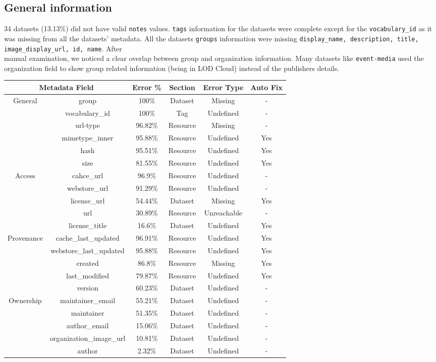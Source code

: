 \documentclass[runningheads,a4paper]{llncs}
\begin{document}
\subsection{General information} 34 datasets (13.13\%) did not have valid \texttt{notes} values. \texttt{tags} information for the datasets were complete except for the \texttt{vocabulary\_id} as it was missing from all the datasets' metadata. All the datasets \texttt{groups} information were missing \texttt{display\_name, description, title, image\_display\_url, id, name}. After \\manual examination, we noticed a clear overlap between group and organization information. Many datasets like \texttt{event-media} used the organization field to show group related information (being in LOD Cloud) instead of the publishers details.\\

\begin{center}
\begin{tabular}{|c|c|c|c|c|c|}

\hline
\multicolumn{2}{|c|}{Metadata Field} & Error \% & Section & Error Type & Auto Fix\tabularnewline
\hline
\hline
\multirow{6}{*}{General } & group & 100\% & Dataset & Missing & -\tabularnewline
\cline{2-6}
 & vocabulary\_id & 100\% & Tag & Undefined & -\tabularnewline
\cline{2-6}
 & url-type & 96.82\% & Resource & Missing & -\tabularnewline
\cline{2-6}
 & mimetype\_inner & 95.88\% & Resource & Undefined & Yes\tabularnewline
\cline{2-6}
 & hash & 95.51\% & Resource & Undefined & Yes\tabularnewline
\cline{2-6}
 & size & 81.55\% & Resource & Undefined & Yes\tabularnewline
\hline
\multirow{5}{*}{Access } & cahce\_url & 96.9\% & Resource & Undefined & -\tabularnewline
\cline{2-6}
 & webstore\_url & 91.29\% & Resource & Undefined & -\tabularnewline
\cline{2-6}
 & license\_url & 54.44\% & Dataset & Missing & Yes\tabularnewline
\cline{2-6}
 & url & 30.89\% & Resource & Unreachable & -\tabularnewline
\cline{2-6}
 & license\_title & 16.6\% & Dataset & Undefined & Yes\tabularnewline
\hline
\multirow{5}{*}{Provenance } & cache\_last\_updated & 96.91\% & Resource & Undefined & Yes\tabularnewline
\cline{2-6}
 & webstore\_last\_updated & 95.88\% & Resource & Undefined & Yes\tabularnewline
\cline{2-6}
 & created & 86.8\% & Resource & Missing & Yes\tabularnewline
\cline{2-6}
 & last\_modified & 79.87\% & Resource & Undefined & Yes\tabularnewline
\cline{2-6}
 & version & 60.23\% & Dataset & Undefined & -\tabularnewline
\hline
\multirow{5}{*}{Ownership } & maintainer\_email & 55.21\% & Dataset & Undefined & -\tabularnewline
\cline{2-6}
 & maintainer & 51.35\% & Dataset & Undefined & -\tabularnewline
\cline{2-6}
 & author\_email & 15.06\% & Dataset & Undefined & -\tabularnewline
\cline{2-6}
 & organization\_image\_url & 10.81\% & Dataset & Undefined & -\tabularnewline
\cline{2-6}
 & author & 2.32\% & Dataset & Undefined & -\tabularnewline
\hline
\end{tabular}
 \label{tab:main}
\end{center}
\end{document}
